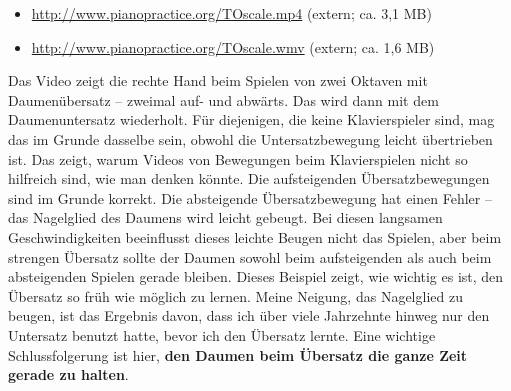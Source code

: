 \begin{itemize} 
 \item \hyperref[http://www.pianopractice.org/TOscale.mp4]{http://www.pianopractice.org/TOscale.mp4} (extern; ca. 3,1 MB)
 \item \hyperref[http://www.pianopractice.org/TOscale.wmv]{http://www.pianopractice.org/TOscale.wmv} (extern; ca. 1,6 MB)
 \end{itemize}
Das Video zeigt die rechte Hand beim Spielen von zwei Oktaven mit Daumenübersatz -- zweimal auf- und abwärts.
Das wird dann mit dem Daumenuntersatz wiederholt.
Für diejenigen, die keine Klavierspieler sind, mag das im Grunde dasselbe sein, obwohl die Untersatzbewegung leicht übertrieben ist.
Das zeigt, warum Videos von Bewegungen beim Klavierspielen nicht so hilfreich sind, wie man denken könnte.
Die aufsteigenden Übersatzbewegungen sind im Grunde korrekt.
Die absteigende Übersatzbewegung hat einen Fehler -- das Nagelglied des Daumens wird leicht gebeugt.
Bei diesen langsamen Geschwindigkeiten beeinflusst dieses leichte Beugen nicht das Spielen, aber beim strengen Übersatz sollte der Daumen sowohl beim aufsteigenden als auch beim absteigenden Spielen gerade bleiben.
Dieses Beispiel zeigt, wie wichtig es ist, den Übersatz so früh wie möglich zu lernen.
Meine Neigung, das Nagelglied zu beugen, ist das Ergebnis davon, dass ich über viele Jahrzehnte hinweg nur den Untersatz benutzt hatte, bevor ich den Übersatz lernte.
Eine wichtige Schlussfolgerung ist hier, \textbf{den Daumen beim Übersatz die ganze Zeit gerade zu halten}.



